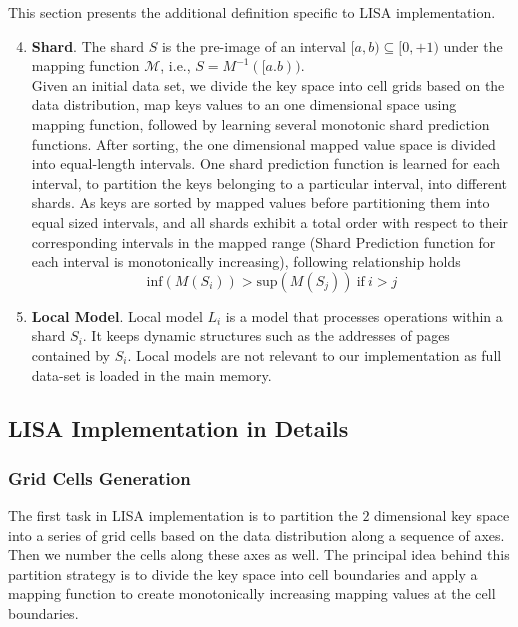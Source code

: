 This section presents the additional definition specific to LISA implementation.

\begin{enumerate}
\setcounter{enumi}{3}
	\item \textbf{Shard}. The shard $S$ is the pre-image of an
interval $[a, b) \subseteq [0, +1)$ under the mapping function $\mathcal{M}$,  i.e., $S = M^{-1}([a.b))$. \\
Given an initial data set, we divide the key space into cell grids based on the data distribution, map keys values to an one dimensional space using mapping function, followed by learning several monotonic shard prediction functions. After sorting, the one dimensional mapped value space is divided into equal-length intervals. One shard prediction function is learned for each interval, to partition the keys belonging to a particular interval, into different shards. As keys are sorted by mapped values before partitioning them into equal sized intervals, and all shards exhibit a total order with respect to their corresponding intervals in the mapped range (Shard Prediction function for each interval is monotonically increasing), following relationship holds
$$ \text{inf} (M(S_{i}))  > \text{sup} (M(S_{j}))\: \text{if}\: i > j$$

\item \textbf{Local Model}. Local model $L_{i}$ is a model that processes operations within a shard $S_i$. It keeps dynamic structures such as the addresses of pages contained by $S_{i}$. Local models are not relevant to our implementation as full data-set is loaded in the main memory.
\end{enumerate}

\subsection{LISA Implementation in Details}
\subsubsection{Grid Cells Generation}
The first task in LISA implementation is to partition the $2$ dimensional key space into a series of grid cells based on the data distribution along a sequence of axes. Then we number the cells along these axes as well. The principal idea behind this partition strategy is to divide the key space into cell boundaries and apply a mapping function to create monotonically increasing mapping values at the cell boundaries. 

